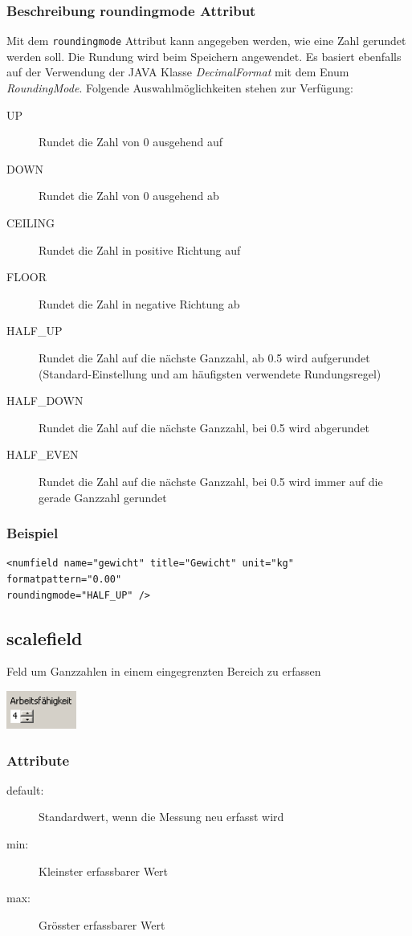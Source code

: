 \documentclass[a4paper]{scrartcl}
\begin{document}
\subsubsection{Beschreibung roundingmode Attribut}
Mit dem \texttt{roundingmode} Attribut kann angegeben werden, wie eine Zahl gerundet
werden soll. Die Rundung wird beim Speichern angewendet. Es basiert ebenfalls auf der Verwendung der JAVA Klasse
\textit{DecimalFormat} mit dem Enum \textit{RoundingMode}.
Folgende Auswahlmöglichkeiten stehen zur Verfügung:
\begin{description}
  \item [UP] Rundet die Zahl von 0 ausgehend auf
  \item [DOWN] Rundet die Zahl von 0 ausgehend ab
  \item [CEILING] Rundet die Zahl in positive Richtung auf
  \item [FLOOR] Rundet die Zahl in negative Richtung ab
  \item [HALF\_UP] Rundet die Zahl auf die nächste Ganzzahl, ab 0.5 wird aufgerundet \\
  (Standard-Einstellung und am häufigsten verwendete Rundungsregel)
  \item [HALF\_DOWN] Rundet die Zahl auf die nächste Ganzzahl, bei 0.5 wird
  abgerundet
  \item [HALF\_EVEN] Rundet die Zahl auf die nächste Ganzzahl, bei 0.5 wird immer
  auf die gerade Ganzzahl gerundet
\end{description}
\subsubsection{Beispiel}
\begin{lstlisting}
<numfield name="gewicht" title="Gewicht" unit="kg" formatpattern="0.00"
roundingmode="HALF_UP" />
\end{lstlisting}

\subsection{scalefield}
Feld um Ganzzahlen in einem eingegrenzten Bereich zu erfassen
\begin{center}
    \includegraphics[width=2.3cm]{images/scalefield.png}
\end{center}
\subsubsection{Attribute}
\begin{description}
    \item[default:] Standardwert, wenn die Messung neu erfasst wird
    \item[min:] Kleinster erfassbarer Wert
    \item[max:] Grösster erfassbarer Wert
\end{description}
\end{document}
